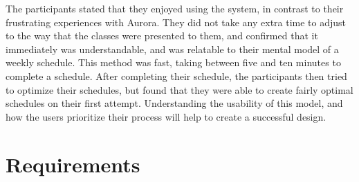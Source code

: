 \documentclass{article}
\begin{document}
\newline
The participants stated that they enjoyed using the system, in contrast to their frustrating experiences with Aurora. They did not take any extra time to adjust to the way that the classes were presented to them, and confirmed that it immediately was understandable, and was relatable to their mental model of a weekly schedule. This method was fast, taking between five and ten minutes to complete a schedule. After completing their schedule, the participants then tried to optimize their schedules, but found that they were able to create fairly optimal schedules on their first attempt. Understanding the usability of this model, and how the users prioritize their process will help to create a successful design.

\section{Requirements}
\end{document}
